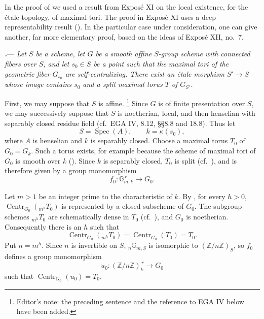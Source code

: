 In the proof of  we used a result from Exposé XI on the
local existence, for the étale topology, of maximal tori.  The proof
in Exposé XI uses a deep representability result \textup{()}.
In the particular case under consideration, one can give another,
far more elementary proof, based on the ideas of Exposé XII, no.~7.

\par\medskip\noindent
{}\textbf{\textit{.}}---
\textit{Let \(S\) be a scheme, let \(G\) be a smooth affine
\(S\)-group scheme with connected fibers over \(S\), and let
\(s_0\in S\) be a point such that the maximal tori of the geometric
fiber \(G_{\bar s_0}\) are self-centralizing.  There exist an étale
morphism \(S'\to S\) whose image contains \(s_0\) and a split maximal
torus \(T\) of \(G_{S'}\).}

First, we may suppose that \(S\) is affine.
\footnote{Editor's note: the preceding sentence and the reference
to EGA IV below have been added.}
Since \(G\) is of finite presentation over \(S\), we may successively
suppose that \(S\) is noetherian, local, and then henselian with
separably closed residue field \textup{(cf.\ EGA IV, 8.12,
\S\S 8.8 and 18.8)}.  Thus let
\[
  S=\operatorname{Spec}(A),
  \qquad
  k=\kappa(s_0),
\]
where \(A\) is henselian and \(k\) is separably closed.  Choose a
maximal torus \(T_0\) of \(G_0=G_k\).  Such a torus exists, for
example because the scheme of maximal tori of \(G_0\) is smooth over
\(k\) \textup{()}.  Since \(k\) is separably
closed, \(T_0\) is split \textup{(cf.\ )}, and is
therefore given by a group monomorphism
\[
  f_0\colon \mathbb G_{m,k}^{\,r}\longrightarrow G_0.
\]


Let \(m>1\) be an integer prime to the characteristic of \(k\).
By , for every \(h>0\),
\(\operatorname{Centr}_{G_0}({}_{m^h}T_0)\) is represented by a
closed subscheme of \(G_0\).  The subgroup schemes
\({}_{m^h}T_0\) are schematically dense in \(T_0\)
\textup{(cf.\ )}, and \(G_0\) is noetherian.
Consequently there is an \(h\) such that
\[
  \operatorname{Centr}_{G_0}({}_{m^h}T_0)
  =
  \operatorname{Centr}_{G_0}(T_0)
  =
  T_0.
\]
Put \(n=m^h\).  Since \(n\) is invertible on \(S\),
\({}_n\mathbb G_{m,S}\) is isomorphic to
\((\mathbb Z/n\mathbb Z)_S\), so \(f_0\) defines a group
monomorphism
\[
  u_0\colon(\mathbb Z/n\mathbb Z)_k^{\,r}\longrightarrow G_0
\]
such that \(\operatorname{Centr}_{G_0}(u_0)=T_0\).


